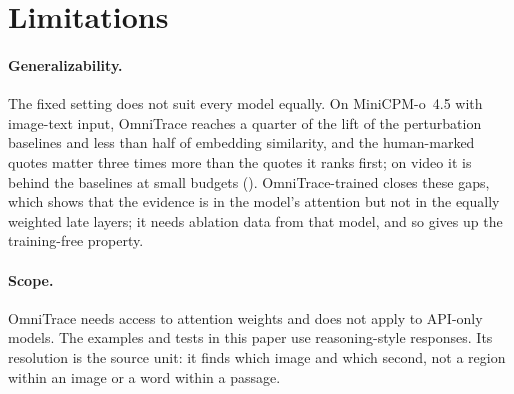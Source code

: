 \section*{Limitations}
\label{sec:limitations}

\paragraph{Generalizability.}
The fixed setting does not suit every model equally. On MiniCPM-o~4.5 with image-text input, OmniTrace reaches a quarter of the lift of the perturbation baselines and less than half of embedding similarity, and the human-marked quotes matter three times more than the quotes it ranks first; on video it is behind the baselines at small budgets ().
OmniTrace-trained closes these gaps, which shows that the evidence is in the model's attention but not in the equally weighted late layers; it needs ablation data from that model, and so gives up the training-free property.

\paragraph{Scope.}
OmniTrace needs access to attention weights and does not apply to API-only models.
The examples and tests in this paper use reasoning-style responses. Its resolution is the source unit: it finds which image and which second, not a region within an image or a word within a passage.
